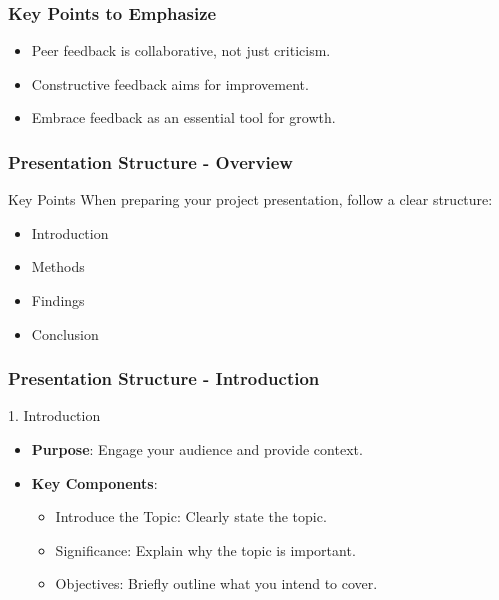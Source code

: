 \documentclass[aspectratio=169]{beamer}
\begin{document}
\begin{frame}[fragile]
    \frametitle{Key Points to Emphasize}
    \begin{itemize}
        \item Peer feedback is collaborative, not just criticism.
        \item Constructive feedback aims for improvement.
        \item Embrace feedback as an essential tool for growth.
    \end{itemize}
\end{frame}

\begin{frame}[fragile]
    \frametitle{Presentation Structure - Overview}
    \begin{block}{Key Points}
        When preparing your project presentation, follow a clear structure:
        \begin{itemize}
            \item Introduction
            \item Methods
            \item Findings
            \item Conclusion
        \end{itemize}
    \end{block}
\end{frame}

\begin{frame}[fragile]
    \frametitle{Presentation Structure - Introduction}
    \begin{block}{1. Introduction}
        \begin{itemize}
            \item \textbf{Purpose}: Engage your audience and provide context.
            \item \textbf{Key Components}:
            \begin{itemize}
                \item Introduce the Topic: Clearly state the topic. 
                \item Significance: Explain why the topic is important.
                \item Objectives: Briefly outline what you intend to cover.
            \end{itemize}
        \end{itemize}
    \end{block}
\end{frame}
\end{document}
